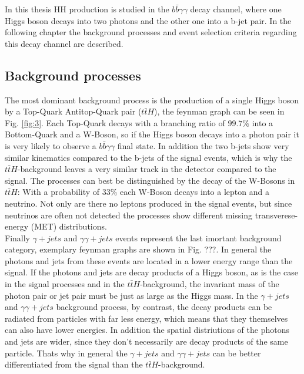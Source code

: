 \label{sec:prep}

In this thesis HH production is studied in the $b \bar{b} \gamma \gamma$ decay channel, where one Higgs boson decays into two photons
and the other one into a b-jet pair. In the following chapter the background processes and event selection criteria regarding this decay channel are described.

\subsection{Background processes}
\label{sec:bkgproccess}

The most dominant background process is the production of a single Higgs boson by a Top-Quark Antitop-Quark pair ($t\bar{t}H$), the feynman graph can be seen in Fig. \ref{fig:3}.
Each Top-Quark decays with a branching ratio of $99.7 \%$ into a Bottom-Quark and a W-Boson, so if the Higgs boson decays into a photon pair
it is very likely to observe a $b \bar{b} \gamma \gamma$ final state. In addition the two b-jets show very similar kinematics compared to the 
b-jets of the signal events, which is why the $t\bar{t}H$-background leaves a very similar track in the detector compared to the signal.
The processes can best be distinguished by the decay of the W-Bosons in $t\bar{t}H$: With a probability of $33 \%$ each W-Boson decays into
a lepton and a neutrino. Not only are there no leptons produced in the signal events, but since neutrinos are often not detected the processes
show different missing transverese-energy (MET) distributions. \\


Finally $\gamma  + jets$ and $\gamma \gamma  + jets$ events represent the last imortant background category, exemplary feynman graphs are shown in Fig. ???.
In general the photons and jets from these events are located in a lower energy range than the signal. If the photons and jets are decay products of a Higgs boson,
as is the case in the signal processes and in the $t \bar{t} H$-background, the invariant mass of the photon pair or jet pair must be just as large as the Higgs mass. In the $\gamma  + jets$ and $\gamma \gamma  + jets$
background process, by contrast, the decay products can be radiated from particles with far less energy, which means that they themselves can also have lower energies. 
In addition the spatial distriutions of the photons and jets are wider, since they don't necessarily are decay products
of the same particle. Thats why in general the $\gamma  + jets$ and $\gamma \gamma  + jets$ can be better differentiated from the signal than
the $t\bar{t}H$-background. \\

